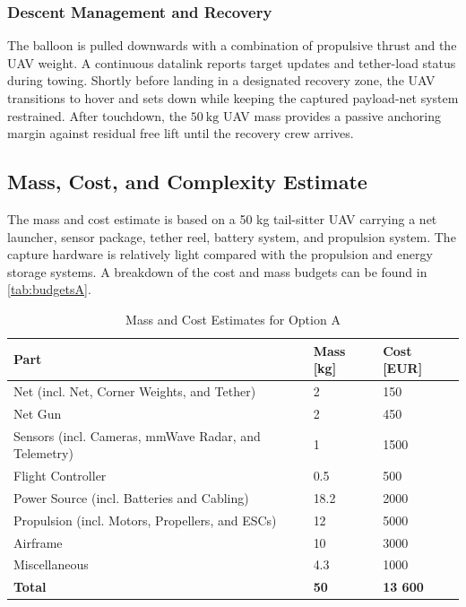 \subsubsection{Descent Management and Recovery}
The balloon is pulled downwards with a combination of propulsive thrust and the UAV weight. A continuous datalink reports target updates and tether-load status during towing. Shortly before landing in a designated recovery zone, the UAV transitions to hover and sets down while keeping the captured payload-net system restrained. After touchdown, the \(50~\mathrm{kg}\) UAV mass provides a passive anchoring margin against residual free lift until the recovery crew arrives.




\subsection{Mass, Cost, and Complexity Estimate}

The mass and cost estimate is based on a 50 kg tail-sitter UAV carrying a net launcher, sensor package, tether reel, battery system, and propulsion system. The capture hardware is relatively light compared with the propulsion and energy storage systems. A breakdown of the cost and mass budgets can be found in \autoref{tab:budgetsA}.

\begin{table}[H]
\centering
\caption{Mass and Cost Estimates for Option A}
\label{tab:budgetsA}{%
\begin{tabular}{lll}
\hline
\textbf{Part}                                   & \textbf{Mass [kg]} & \textbf{Cost [EUR]} \\ \hline
Net (incl. Net, Corner Weights, and Tether)     & 2                      & 150                   \\
Net Gun                                         & 2                      & 450                   \\
Sensors (incl. Cameras, mmWave Radar, and Telemetry)  & 1                      & 1500                  \\
Flight Controller                               & 0.5                    & 500                   \\
Power Source (incl. Batteries and Cabling)      & 18.2                   & 2000                  \\
Propulsion (incl. Motors, Propellers, and ESCs) & 12                     & 5000                  \\
Airframe                                        & 10                     & 3000                  \\
Miscellaneous                                   & 4.3                    & 1000                  \\
\textbf{Total}                                  & \textbf{50}            & \textbf{13 600}       \\ \hline
\end{tabular}%
}
\end{table}

